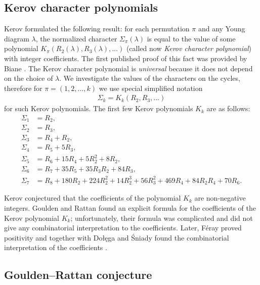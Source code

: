 \documentclass[submission]{FPSAC2021}
\begin{document}
\subsection{Kerov character polynomials}

Kerov formulated the following result: for each permutation $\pi$ and any Young
diagram $\lambda$, the normalized character $\Sigma_{\pi}(\lambda)$ is equal to
the value of some polynomial $K_{\pi}(R_2(\lambda), R_3(\lambda), \ldots)$
(called now \emph{Kerov character polynomial}) with integer coefficients. The
first published proof of this fact was provided by Biane \cite{Bia03}. The
Kerov character polynomial is \emph{universal} because it does not depend on the
choice of $\lambda$. We investigate the values of the characters on the cycles, therefore 
for $\pi=(1, 2, \ldots, k)$ we use special simplified notation
\begin{align}
\label{kerpol}
\Sigma_k=K_k(R_2, R_3, \ldots)
\end{align}
for such Kerov polynomials. The first few Kerov polynomials $K_k$ are as follows:
\begin{align*}
\Sigma_1&=R_2,\\
\Sigma_2&=R_3,\\
\Sigma_3&=R_4+R_2,\\
\Sigma_4&=R_5+5R_3,\\
\Sigma_5&=R_6+15R_4+5R_2^2+8R_2,\\
\Sigma_6&=R_7+35R_5+35R_3R_2+84R_3, \\
\Sigma_7&=R_8+180R_2+224R_2^2+14R_2^3+56R_3^2+469R_4+84R_2R_4+70R_6.
\end{align*}

Kerov conjectured that the coefficients of the polynomial $K_k$ are non-negative integers.
Goulden and Rattan \cite{GR05} found an explicit formula for the coefficients of the Kerov
polynomial $K_k$; unfortunately, their formula was complicated and did not give
any combinatorial interpretation to the coefficients. Later, F\'{e}ray
proved positivity \cite{Fer09} and together with Dołęga and Śniady found the
combinatorial interpretation of the coefficients \cite{DFS10}.

\subsection{Goulden--Rattan conjecture}
\end{document}
